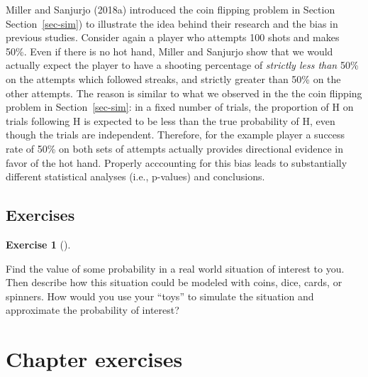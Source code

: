 \documentclass[
  letterpaper,
  DIV=11,
  numbers=noendperiod]{scrreprt}
\theoremstyle{plain}
\theoremstyle{definition}
\theoremstyle{definition}
\newtheorem{exercise}{Exercise}[chapter]
\theoremstyle{definition}
\theoremstyle{remark}
\begin{document}
Miller and Sanjurjo (2018a) introduced the coin flipping problem in
Section Section~\ref{sec-sim}) to illustrate the idea behind their
research and the bias in previous studies. Consider again a player who
attempts 100 shots and makes 50\%. Even if there is no hot hand, Miller
and Sanjurjo show that we would actually expect the player to have a
shooting percentage of \emph{strictly less than} 50\% on the attempts
which followed streaks, and strictly greater than 50\% on the other
attempts. The reason is similar to what we observed in the the coin
flipping problem in Section~\ref{sec-sim}: in a fixed number of trials,
the proportion of H on trials following H is expected to be less than
the true probability of H, even though the trials are independent.
Therefore, for the example player a success rate of 50\% on both sets of
attempts actually provides directional evidence in favor of the hot
hand. Properly acccounting for this bias leads to substantially
different statistical analyses (i.e., p-values) and conclusions.

\subsection{Exercises}\label{exercises-8}

\begin{exercise}[]\protect\hypertarget{exr-literacy-why-spinners}{}\label{exr-literacy-why-spinners}

Find the value of some probability in a real world situation of interest
to you. Then describe how this situation could be modeled with coins,
dice, cards, or spinners. How would you use your ``toys'' to simulate
the situation and approximate the probability of interest?

\end{exercise}

\section{Chapter exercises}\label{chapter-exercises}
\end{document}
